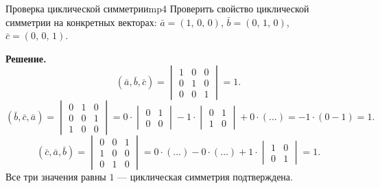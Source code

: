 \documentclass[12pt,a4paper]{article}
\newcommand{\va}{\bar{a}}
\newcommand{\vb}{\bar{b}}
\newcommand{\vc}{\bar{c}}
\begin{document}
\begin{exampleBox}{Проверка циклической симметрии}{mp4}
  Проверить свойство циклической симметрии на конкретных векторах:
  $\va=(1,\,0,\,0)$, $\vb=(0,\,1,\,0)$, $\vc=(0,\,0,\,1)$.

  \textbf{Решение.}
  \[
    (\va,\vb,\vc) =
    \begin{vmatrix}1&0&0\\0&1&0\\0&0&1
    \end{vmatrix} = 1.
  \]
  \[
    (\vb,\vc,\va) =
    \begin{vmatrix}0&1&0\\0&0&1\\1&0&0
    \end{vmatrix}
    = 0\cdot
    \begin{vmatrix}0&1\\0&0
    \end{vmatrix}
    - 1\cdot
    \begin{vmatrix}0&1\\1&0
    \end{vmatrix}
    + 0\cdot(\ldots)
    = -1\cdot(0-1) = 1.
  \]
  \[
    (\vc,\va,\vb) =
    \begin{vmatrix}0&0&1\\1&0&0\\0&1&0
    \end{vmatrix}
    = 0\cdot(\ldots)
    - 0\cdot(\ldots)
    + 1\cdot
    \begin{vmatrix}1&0\\0&1
    \end{vmatrix} = 1.
  \]
  Все три значения равны $1$ --- циклическая симметрия подтверждена.
\end{exampleBox}
\end{document}
